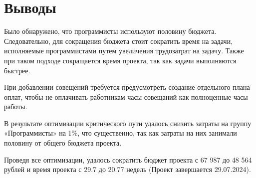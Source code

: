 \section*{Выводы}

Было обнаружено, что программисты используют половину бюджета. Следовательно, для сокращения бюджета стоит сократить время на задачи, исполняемые программистами путем увеличения трудозатрат на задачу. Также при таком подходе сокращается время проекта, так как задачи выполняются быстрее.

При добавлении совещений требуется предусмотреть создание отдельного плана оплат, чтобы не оплачивать работникам часы совещаний как полноценные часы работы.

В результате оптимизации критического пути удалось снизить затраты на группу «Программисты» на 1\%, что существенно, так как затраты на них занимали половину от общего бюджета проекта.

Проведя все оптимизации, удалось сократить бюджет проекта с 67 987 до 48 564 рублей и время проекта с 29.7 до 20.77 недель (Проект завершается 29.07.2024).